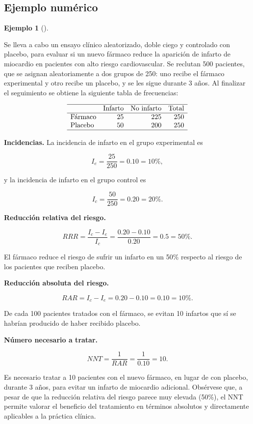 \documentclass[
  spanish,
  a4paper,
]{scrreport}
\theoremstyle{definition}
\newtheorem{example}{Ejemplo}[chapter]
\theoremstyle{definition}
\theoremstyle{remark}
\begin{document}
\subsection{Ejemplo numérico}\label{ejemplo-numuxe9rico-1}

\begin{example}[]\protect\hypertarget{exm-experimentales-rrr-rar-nnt}{}\label{exm-experimentales-rrr-rar-nnt}

Se lleva a cabo un ensayo clínico aleatorizado, doble ciego y controlado
con placebo, para evaluar si un nuevo fármaco reduce la aparición de
infarto de miocardio en pacientes con alto riesgo cardiovascular. Se
reclutan 500 pacientes, que se asignan aleatoriamente a dos grupos de
250: uno recibe el fármaco experimental y otro recibe un placebo, y se
les sigue durante 3 años. Al finalizar el seguimiento se obtiene la
siguiente tabla de frecuencias:

\[
\begin{array}{lrrr}
\hline
 & \mbox{Infarto} & \mbox{No infarto} & \mbox{Total}\\
\hline
\mbox{Fármaco} & 25 & 225 & 250\\
\mbox{Placebo} & 50 & 200 & 250\\
\hline
\end{array}
\]

\textbf{Incidencias.} La incidencia de infarto en el grupo experimental
es

\[I_e = \frac{25}{250} = 0.10 = 10\%,\]

y la incidencia de infarto en el grupo control es

\[I_c = \frac{50}{250} = 0.20 = 20\%.\]

\textbf{Reducción relativa del riesgo.}

\[RRR = \frac{I_c - I_e}{I_c} = \frac{0.20 - 0.10}{0.20} = 0.5 = 50\%.\]

El fármaco reduce el riesgo de sufrir un infarto en un 50\% respecto al
riesgo de los pacientes que reciben placebo.

\textbf{Reducción absoluta del riesgo.}

\[RAR = I_c - I_e = 0.20 - 0.10 = 0.10 = 10\%.\]

De cada 100 pacientes tratados con el fármaco, se evitan 10 infartos que
sí se habrían producido de haber recibido placebo.

\textbf{Número necesario a tratar.}

\[NNT = \frac{1}{RAR} = \frac{1}{0.10} = 10.\]

Es necesario tratar a 10 pacientes con el nuevo fármaco, en lugar de con
placebo, durante 3 años, para evitar un infarto de miocardio adicional.
Obsérvese que, a pesar de que la reducción relativa del riesgo parece
muy elevada (50\%), el NNT permite valorar el beneficio del tratamiento
en términos absolutos y directamente aplicables a la práctica clínica.

\end{example}
\end{document}
